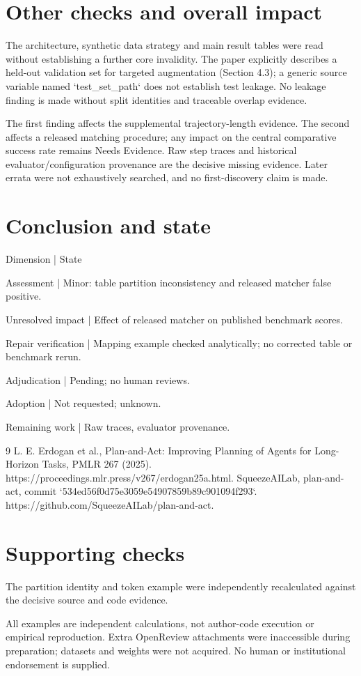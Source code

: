 \documentclass[10pt]{article}
\begin{document}
\section*{Other checks and overall impact}
The architecture, synthetic data strategy and main result tables were read without establishing a further core invalidity. The paper explicitly describes a held-out validation set for targeted augmentation (Section 4.3); a generic source variable named `test\_set\_path` does not establish test leakage. No leakage finding is made without split identities and traceable overlap evidence.\par
The first finding affects the supplemental trajectory-length evidence. The second affects a released matching procedure; any impact on the central comparative success rate remains Needs Evidence. Raw step traces and historical evaluator/configuration provenance are the decisive missing evidence. Later errata were not exhaustively searched, and no first-discovery claim is made.\par
\section*{Conclusion and state}
Dimension | State\par
Assessment | Minor: table partition inconsistency and released matcher false positive.\par
Unresolved impact | Effect of released matcher on published benchmark scores.\par
Repair verification | Mapping example checked analytically; no corrected table or benchmark rerun.\par
Adjudication | Pending; no human reviews.\par
Adoption | Not requested; unknown.\par
Remaining work | Raw traces, evaluator provenance.\par
9 L. E. Erdogan et al., Plan-and-Act: Improving Planning of Agents for Long-Horizon Tasks, PMLR 267 (2025). https://proceedings.mlr.press/v267/erdogan25a.html. SqueezeAILab, plan-and-act, commit `534ed56f0d75e3059e54907859b89c901094f293`. https://github.com/SqueezeAILab/plan-and-act.\par
\section*{Supporting checks}
The partition identity and token example were independently recalculated against the decisive source and code evidence.\par
All examples are independent calculations, not author-code execution or empirical reproduction. Extra OpenReview attachments were inaccessible during preparation; datasets and weights were not acquired. No human or institutional endorsement is supplied.\par
\end{document}
